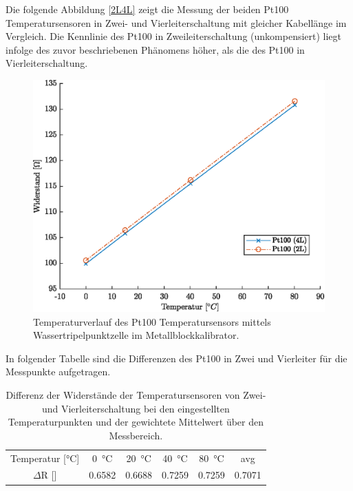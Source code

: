 Die folgende Abbildung \ref{2L4L} zeigt die Messung der beiden Pt100 Temperatursensoren in Zwei- und Vierleiterschaltung mit gleicher Kabellänge im Vergleich. Die Kennlinie des Pt100 in Zweileiterschaltung (unkompensiert) liegt infolge des zuvor beschriebenen Phänomens höher, als die des Pt100 in Vierleiterschaltung. 

\begin{figure}[H]
	\centering
	\includegraphics[height=0.3\textheight]{../MLAB/Vergleich2L4L.eps}
	\caption[Temperaturverlauf des Pt100 Temperatursensors mittels Wassertripelpunktzelle]{ Temperaturverlauf des Pt100 Temperatursensors mittels Wassertripelpunktzelle im Metallblockkalibrator.}
	\label{fig:2L4L}
\end{figure}

In folgender Tabelle sind die Differenzen des Pt100 in Zwei und Vierleiter für die Messpunkte aufgetragen.

\begin{table}[H]
	\centering
	\caption{Differenz der Widerstände der Temperatursensoren von Zwei- und Vierleiterschaltung bei den eingestellten Temperaturpunkten und der gewichtete Mittelwert über den Messbereich.}
	\label{tab:VergleichTPZ}
	\begin{tabular}{cccccc}
		Temperatur [\si{\celsius}] & \SI{0}{\celsius} & \SI{20}{\celsius} & \SI{40}{\celsius}&\SI{80}{\celsius} & avg\\ 
		$\Delta$R [\ohm] & \num{0,6582} & \num{0.6688} &  \num{0,7259}& \num{0,7259}& \num{0.7071} \\
	\end{tabular} 
\end{table}


